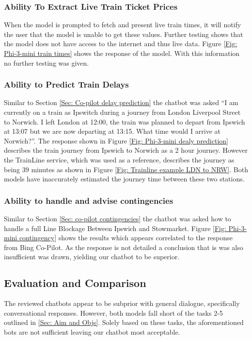\subsubsection{Ability To Extract Live Train Ticket Prices}
When the model is prompted to fetch and present live train times, it will notify the user that the model is unable to get these values. Further testing shows that the model does not have access to the internet and thus live data. Figure \ref{Fig: Phi-3-mini train times} shows the response of the model. With this information no further testing was given.

\subsubsection{Ability to Predict Train Delays}
Similar to Section \ref{Sec: Co-pilot delay prediction} the chatbot was asked ``I am currently on a train as Ipswitch during a journey from London Liverpool Street to Norwich. I left London at 12:00, the train was planned to depart from Ipswich at 13:07 but we are now departing at 13:15. What time would I arrive at Norwich?''. The response shown in Figure \ref{Fig: Phi-3-mini dealy prediction} describes the train journey from Ipswich to Norwich as a 2 hour journey. However the TrainLine service, which was used as a reference, describes the journey as being 39 minutes as shown in Figure \ref{Fig: Trainline example LDN to NRW}. Both models have inaccurately estimated the journey time between these two stations.

\subsubsection{Ability to handle and advise contingencies}
Similar to Section \ref{Sec: co-pilot contingencies} the chatbot was asked how to handle a full Line Blockage Between Ipswich and Stowmarket. Figure \ref{Fig: Phi-3-mini contingency} shows the results which appears correlated to the response from Bing Co-Pilot. As the response is not detailed a conclusion that is was also insufficient was drawn, yielding our chatbot to be superior. 


\subsection{Evaluation and Comparison}
The reviewed chatbots appear to be subprior with general dialogue, specifically conversational responses. However, both models fall short of the tasks 2-5 outlined in \ref{Sec: Aim and Objs}. Solely based on these tasks, the aforementioned bots are not sufficient leaving our chatbot most acceptable.